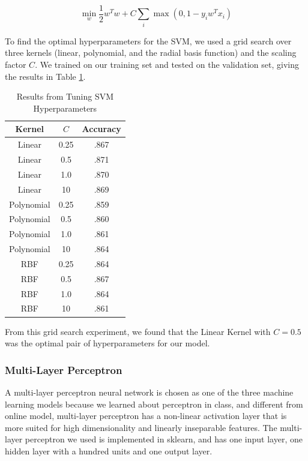 \documentclass[conference]{IEEEtran}
\begin{document}
		\begin{equation} \label{soft_svm}
				\min_{w} \frac{1}{2}w^{T}w + C \sum_{i} \max(0, 1-y_{i}w^{T}x_{i})
		\end{equation}

		To find the optimal hyperparameters for the SVM, we used a grid search over three kernels (linear, polynomial, and the radial basis function) and the scaling factor $C$. We trained on our training set and tested on the validation set, giving the results in Table \ref{svm_grid_search}.

		\begin{table}[h!]
		\centering
		\begin{tabular}{| c | c | c |}
		\hline
		\textbf{Kernel} & $C$ & \textbf{Accuracy} \\
		\hline
		Linear & 0.25 & .867 \\
		\hline
		Linear & 0.5 & .871 \\
		\hline
		Linear & 1.0 & .870 \\
		\hline
		Linear & 10 & .869 \\
		\hline
		Polynomial & 0.25 & .859 \\
		\hline
		Polynomial & 0.5 & .860 \\
		\hline
		Polynomial & 1.0 & .861 \\
		\hline
		Polynomial & 10 & .864 \\
		\hline
		RBF & 0.25 & .864 \\
		\hline
		RBF & 0.5 & .867 \\
		\hline
		RBF & 1.0 & .864 \\
		\hline
		RBF & 10 & .861 \\
		\hline
		\end{tabular}
		\caption{Results from Tuning SVM Hyperparameters}
		\label{svm_grid_search}
		\end{table}

		From this grid search experiment, we found that the Linear Kernel with $C = 0.5$ was the optimal pair of hyperparameters for our model.

		\subsubsection{Multi-Layer Perceptron}
		A multi-layer perceptron neural network is chosen as one of the three machine learning models because we learned about perceptron in class, and different from online model, multi-layer perceptron has a non-linear activation layer that is more suited for high dimensionality and linearly inseparable features. The multi-layer perceptron we used is implemented in sklearn, and has one input layer, one hidden layer with a hundred units and one output layer.
		
\end{document}
